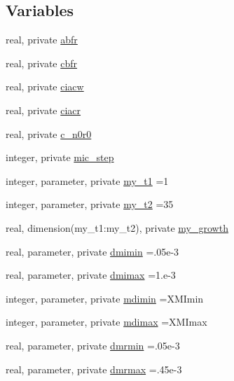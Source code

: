 \subsection*{Variables}
\begin{DoxyCompactItemize}
\item 
real, private \hyperlink{namespacemodule__microphysics_a8f4f8d798ec89d8bb550fa6b6f8eda06}{abfr}
\item 
real, private \hyperlink{namespacemodule__microphysics_afdcb4cd9370ca50745e65221becb6eae}{cbfr}
\item 
real, private \hyperlink{namespacemodule__microphysics_a9e41f7e6287fe7ede81f17b9e041c09e}{ciacw}
\item 
real, private \hyperlink{namespacemodule__microphysics_a1c6192a9baafa2b341b19628e00c19b5}{ciacr}
\item 
real, private \hyperlink{namespacemodule__microphysics_ac36c8de45d04aab21833d22133311284}{c\+\_\+n0r0}
\item 
integer, private \hyperlink{namespacemodule__microphysics_acb3899d31d6f2079a2d41c3e551e3443}{mic\+\_\+step}
\item 
integer, parameter, private \hyperlink{namespacemodule__microphysics_aae73524f22f4bc2373aaa5d8a6f7e7d6}{my\+\_\+t1} =1
\item 
integer, parameter, private \hyperlink{namespacemodule__microphysics_a01af6bac32c88fd12ba020f66ad0ae80}{my\+\_\+t2} =35
\item 
real, dimension(my\+\_\+t1\+:my\+\_\+t2), private \hyperlink{namespacemodule__microphysics_a05041f6bd94be58f8b3bddac6b374b41}{my\+\_\+growth}
\item 
real, parameter, private \hyperlink{namespacemodule__microphysics_a10a6db795f339c47c5afd6916d0c196b}{dmimin} =.\+05e-\/3
\item 
real, parameter, private \hyperlink{namespacemodule__microphysics_ab71ad8ff5f6f170585e96194373be5cc}{dmimax} =1.e-\/3
\item 
integer, parameter, private \hyperlink{namespacemodule__microphysics_a81bcf203ed1a75b10ea2c7f97ac56a21}{mdimin} =X\+M\+Imin
\item 
integer, parameter, private \hyperlink{namespacemodule__microphysics_a28b728213c1425c1bd5c05c9a469b92a}{mdimax} =X\+M\+Imax
\item 
real, parameter, private \hyperlink{namespacemodule__microphysics_a67a841cda9f172633fa4895d1a3433e7}{dmrmin} =.\+05e-\/3
\item 
real, parameter, private \hyperlink{namespacemodule__microphysics_a5faae0c4f54f72f04b2874f5588276f5}{dmrmax} =.\+45e-\/3

\end{DoxyCompactItemize}
